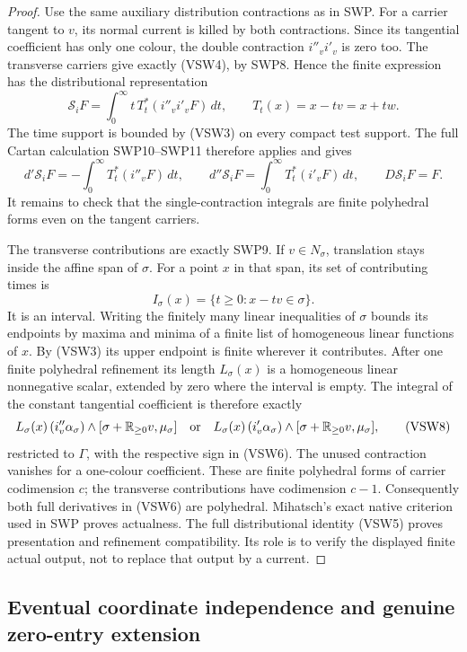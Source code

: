 \begin{proof}
Use the same auxiliary distribution contractions as in SWP.
For a carrier tangent to $v$, its normal current is killed by
both contractions.  Since its tangential coefficient has only
one colour, the double contraction $i''_vi'_v$ is zero too.
The transverse carriers give exactly (VSW4), by SWP8.  Hence
the finite expression has the distributional representation
\[
        \mathcal S_iF=
               \int_0^\infty t\,T_t^*(i''_vi'_vF)\,dt,
             \qquad T_t(x)=x-tv=x+tw.
 \tag{VSW5}
\]
The time support is bounded by (VSW3) on every compact test
support.  The full Cartan calculation SWP10--SWP11 therefore
applies and gives
\[
 d'\mathcal S_iF=-\int_0^\infty T_t^*(i''_vF)\,dt,
 \qquad
 d''\mathcal S_iF=\int_0^\infty T_t^*(i'_vF)\,dt,
 \qquad D\mathcal S_iF=F.
 \tag{VSW6}
\]
It remains to check that the single-contraction integrals are
finite polyhedral forms even on the tangent carriers.

The transverse contributions are exactly SWP9.  If $v\in
N_\sigma$, translation stays inside the affine span of $\sigma$.
For a point $x$ in that span, its set of contributing times is
\[
             I_\sigma(x)=\{t\ge0:x-tv\in\sigma\}.
 \tag{VSW7}
\]
It is an interval.  Writing the finitely many linear inequalities
of $\sigma$ bounds its endpoints by maxima and minima of a finite
list of homogeneous linear functions of $x$.  By (VSW3) its upper
endpoint is finite wherever it contributes.  After one finite
polyhedral refinement its length $L_\sigma(x)$ is a homogeneous
linear nonnegative scalar, extended by zero where the interval
is empty.  The integral of the constant tangential coefficient is
therefore exactly
\[
 L_\sigma(x)\,(i''_v\alpha_\sigma)
      \wedge[\sigma+\mathbb R_{\ge0}v,\mu_\sigma]
 \quad\hbox{or}\quad
 L_\sigma(x)\,(i'_v\alpha_\sigma)
      \wedge[\sigma+\mathbb R_{\ge0}v,\mu_\sigma],
 \tag{VSW8}
\]
restricted to $\Gamma$, with the respective sign in (VSW6).
The unused contraction vanishes for a one-colour coefficient.
These are finite polyhedral forms of carrier codimension $c$;
the transverse contributions have codimension $c-1$.
Consequently both full derivatives in (VSW6) are polyhedral.
Mihatsch's exact native criterion used in SWP proves actualness.
The full distributional identity (VSW5) proves presentation and
refinement compatibility.  Its role is to verify the displayed
finite actual output, not to replace that output by a current.
\end{proof}

\subsection{Eventual coordinate independence and genuine zero-entry extension}

